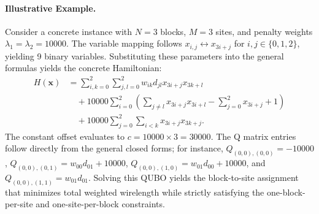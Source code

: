 \documentclass[12pt]{article}
\begin{document}
\paragraph{Illustrative Example.}
Consider a concrete instance with $N=3$ blocks, $M=3$ sites, and penalty weights $\lambda_1 = \lambda_2 = 10000$. The variable mapping follows $x_{i,j} \leftrightarrow x_{3i+j}$ for $i,j \in \{0,1,2\}$, yielding 9 binary variables. Substituting these parameters into the general formulas yields the concrete Hamiltonian:
\begin{align}
    H(\mathbf{x}) &= \sum_{i,k=0}^{2} \sum_{j,l=0}^{2} w_{ik} d_{jl} x_{3i+j} x_{3k+l} \nonumber \\
    &\quad + 10000 \sum_{i=0}^{2} \left( \sum_{j \neq l} x_{3i+j} x_{3i+l} - \sum_{j=0}^{2} x_{3i+j} + 1 \right) \nonumber \\
    &\quad + 10000 \sum_{j=0}^{2} \sum_{i < k} x_{3i+j} x_{3k+j}.
\end{align}
The constant offset evaluates to $c = 10000 \times 3 = 30000$. The Q matrix entries follow directly from the general closed forms; for instance, $Q_{(0,0),(0,0)} = -10000$, $Q_{(0,0),(0,1)} = w_{00} d_{01} + 10000$, $Q_{(0,0),(1,0)} = w_{01} d_{00} + 10000$, and $Q_{(0,0),(1,1)} = w_{01} d_{01}$. Solving this QUBO yields the block-to-site assignment that minimizes total weighted wirelength while strictly satisfying the one-block-per-site and one-site-per-block constraints.
\end{document}

